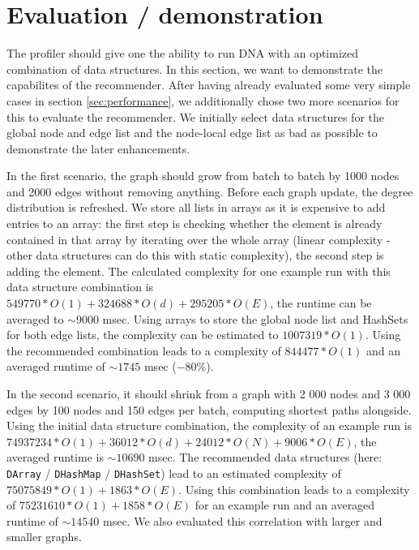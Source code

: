 \section{Evaluation / demonstration}
	The profiler should give one the ability to run DNA with an optimized combination of data
	structures. In this section, we want to demonstrate the capabilites of the recommender.
	After having already evaluated some very simple cases in section \ref{sec:performance},
	we additionally chose two more scenarios for this to evaluate the recommender. We
	initially select data structures for the global node and edge list and the node-local
	edge list as bad as possible to demonstrate the later enhancements.
	
	In the first scenario, the graph should grow from batch to batch by 1000 nodes and 2000
	edges without removing anything. Before each graph update, the degree distribution is
	refreshed. We store all lists in arrays as it is expensive to add entries to an array:
	the first step is checking whether the element is already contained in that array by
	iterating over the whole array (linear complexity - other data structures can do this
	with static complexity), the second step is adding the element. The calculated complexity
	for one example run with this data structure combination is $549770*O(1) + 324688*O(d) +
	295205*O(E)$, the runtime can be averaged to $\sim 9000$ msec. Using arrays to store the
	global node list and HashSets for both edge lists, the complexity can be estimated to
	$1007319*O(1)$. Using the recommended combination leads to a complexity of $844477*O(1)$
	and an averaged runtime of $\sim 1745$ msec ($- 80\%$).
		
	In the second scenario, it should shrink from a graph with 2 000 nodes and 3 000
	edges by 100 nodes and 150 edges per batch, computing shortest paths alongside. Using the
	initial data structure combination, the complexity of an example run is $74937234*O(1) +
	36012*O(d) + 24012*O(N) + 9006*O(E)$, the averaged runtime is $\sim 10690$ msec. The
	recommended data structures (here: \texttt{DArray} / \texttt{DHashMap} /
	\texttt{DHashSet}) lead to an estimated complexity of $75075849*O(1) + 1863*O(E)$. Using
	this combination leads to a complexity of $75231610*O(1) + 1858*O(E)$ for an example run
	and an averaged runtime of $\sim 14540$ msec. We also evaluated this correlation with
	larger and smaller graphs.
	
	
